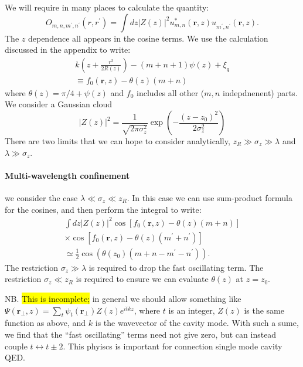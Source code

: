 \documentclass[twocolumn]{revtex4-1}
\renewcommand{\vec}[1]{\mathbf{#1}}
\begin{document}
We will require in many places to calculate the quantity:
\begin{displaymath}
  O_{m,n, m^\prime, n^\prime}(r, r^\prime)=
  \int  dz |Z(z)|^2 
  u^\ast_{m,n}(\vec{r},z)
  u^{}_{m^\prime,n^\prime}(\vec{r},z).
\end{displaymath}
The $z$ dependence all appears in the cosine terms.   We use the calculation
discussed in the appendix to write:
\begin{multline}
  k \left( z + \frac{r^2}{2R(z)} \right) - (m+n+1) \psi(z) + \xi_{q}
  \\\equiv
  f_0(\vec{r},z) - \theta(z) (m+n)
\end{multline}
where $\theta(z) = \pi/4 + \psi(z)$ and $f_0$ includes all other
($m,n$ indepdnenent) parts.  We consider a Gaussian
cloud 
\begin{displaymath}
  |Z(z)|^2 = \frac{1}{\sqrt{2\pi \sigma_z^2}}
  \exp\left( - \frac{(z-z_0)^2}{2 \sigma_z^2} \right)
\end{displaymath}
There are two limits that we can hope to consider analytically,
$z_R \gg \sigma_z \gg \lambda$ and $\lambda \gg \sigma_z$.

\paragraph{Multi-wavelength confinement}
we consider the case $\lambda \ll \sigma_z \ll z_R$.  In this case we
can use sum-product formula for the cosines, and then perform the
integral to write:
\begin{multline}
  \int  dz |Z(z)|^2 
  \cos\left[  f_0(\vec{r},z) - \theta(z) (m+n) \right]
  \\\times\cos\left[  f_0(\vec{r},z) - \theta(z) (m^\prime+n^\prime) \right]
  \\\simeq
  \frac{1}{2}     \cos\left( \theta(z_0) (m+n - m^\prime - n^\prime) \right).
\end{multline}
The restriction $\sigma_z \gg \lambda$ is required to drop the fast
oscillating term.  The restriction $\sigma_z \ll z_R$ is required to
ensure we can evaluate $\theta(z)$ at $z=z_0$.

NB.  \hl{This is incomplete;} in general we should allow something like
$\Psi(\vec{r}_\perp,z) = \sum_t \psi_t(\vec{r}_\perp) Z(z) e^{i t k
  z}$, where $t$ is an integer, $Z(z)$ is the same function as above,
and $k$ is the wavevector of the cavity mode.  With such a sume, we
find that the ``fast oscillating'' terms need not give zero, but can
instead couple $t \leftrightarrow t\pm 2$.  This phyiscs is important
for connection single mode cavity QED.
\end{document}
